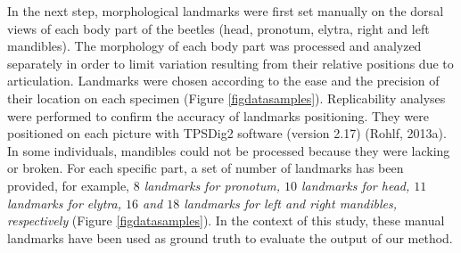 \documentclass[review]{elsarticle}
\begin{document}
In the next step, morphological landmarks were first set manually on the dorsal views of each body part of the beetles (head, pronotum, elytra, right and left mandibles). The morphology of each body part was processed and analyzed separately in order to limit variation resulting from their relative positions due to articulation. Landmarks were chosen according to the ease and the precision of their location on each specimen (Figure \ref{figdatasamples}). Replicability analyses were performed to confirm the accuracy of landmarks positioning. They were positioned on each picture with TPSDig2 software (version 2.17) (Rohlf, 2013a). In some individuals, mandibles could not be processed because they were lacking or broken. For each specific part, a set of number of landmarks has been provided, for example, \textit{$8$ landmarks for pronotum, $10$ landmarks for head, $11$ landmarks for elytra, $16$ and $18$ landmarks for left and right mandibles, respectively} (Figure \ref{figdatasamples}). In the context of this study, these manual landmarks have been used as ground truth to evaluate the output of our method.
\end{document}
